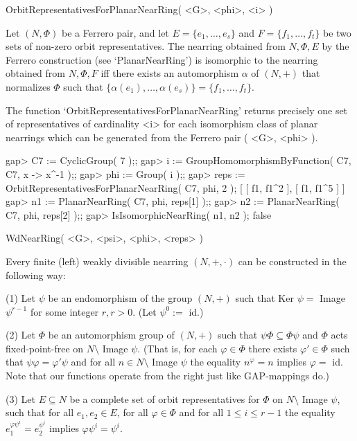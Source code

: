 \>OrbitRepresentativesForPlanarNearRing( <G>, <phi>, <i> )

Let $(N,\Phi)$ be a Ferrero pair, and let $E = \{ e_{1},\ldots,e_{s} \}$ and
$F = \{ f_{1},\ldots,f_{t} \}$ be two sets of non-zero orbit representatives.
The nearring obtained from $N,\Phi, E$ by the Ferrero construction
(see `PlanarNearRing') is isomorphic to the nearring obtained from $N,\Phi, F$
iff there exists an automorphism $\alpha$ of $(N,+)$ that normalizes $\Phi$
such that
$\{ \alpha(e_{1}),\ldots,\alpha(e_{s}) \} = \{ f_{1},\ldots,f_{t} \}$.

The function `OrbitRepresentativesForPlanarNearRing' 
returns precisely one set of representatives of cardinality <i> for each 
isomorphism class of planar nearrings which can be generated from the 
Ferrero pair ( <G>, <phi> ).

\beginexample
    gap> C7 := CyclicGroup( 7 );;
    gap> i := GroupHomomorphismByFunction( C7, C7, x -> x^-1 );;
    gap> phi := Group( i );;
    gap> reps := OrbitRepresentativesForPlanarNearRing( C7, phi, 2 );
    [ [ f1, f1^2 ], [ f1, f1^5 ] ]
    gap> n1 := PlanarNearRing( C7, phi, reps[1] );;
    gap> n2 := PlanarNearRing( C7, phi, reps[2] );;
    gap> IsIsomorphicNearRing( n1, n2 );
    false
\endexample



\>WdNearRing( <G>, <psi>, <phi>, <reps> )

Every finite (left) weakly divisible nearring $(N,+,\cdot)$ can be constructed
in the following way:

(1) Let $\psi$ be an endomorphism of the group $(N,+)$ such that Ker
$\psi =$ Image $\psi^{r-1}$ for some integer $r, r>0$. (Let $\psi^0 :=$ id.)

(2) Let $\Phi$ be an automorphism group of $(N,+)$ such that
$\psi\Phi\subseteq\Phi\psi$ and $\Phi$ acts fixed-point-free on
$N\setminus$ Image $\psi$.
(That is, for each
$\varphi\in\Phi$ there exists $\varphi'\in\Phi$ such that
$\psi\varphi = \varphi'\psi$ and for all $n\in N\setminus$ Image $\psi$ the 
equality $n^\varphi = n$ implies $\varphi =$ id. Note that our functions
operate from the right just like GAP-mappings do.)

(3) Let $E\subseteq N$ be a complete set of orbit representatives for
$\Phi$ on $N\setminus$ Image $\psi$, such that for all $e_1, e_2\in E$, for all
$\varphi\in\Phi$ and for all $1 \leq i \leq r-1$ the equality
$e_1^{\varphi\psi^i} = e_2^{\psi^i}$ implies $\varphi\psi^i = \psi^i$.

